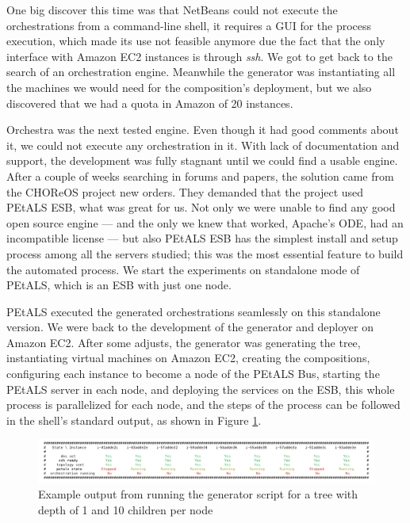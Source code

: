 One big discover this time was that NetBeans could not execute the orchestrations from a command-line shell, it requires a GUI for the process execution, which made its use not feasible anymore due the fact that the only interface with Amazon EC2 instances is through \emph{ssh}. We got to get back to the search of an orchestration engine. Meanwhile the generator was instantiating all the machines we would need for the composition's deployment, but we also discovered that we had a quota in Amazon of 20 instances.

Orchestra was the next tested engine. Even though it had good comments about it, we could not execute any orchestration in it. With lack of documentation and support, the development was fully stagnant until we could find a usable engine. After a couple of weeks searching in forums and papers, the solution came from the CHOReOS project new orders. They demanded that the project used PEtALS ESB, what was great for us. Not only we were unable to find any good open source engine --- and the only we knew that worked, Apache's ODE, had an incompatible license --- but also PEtALS ESB has the simplest install and setup process among all the servers studied; this was the most essential feature to build the automated process. We start the experiments on standalone mode of PEtALS, which is an ESB with just one node.

PEtALS executed the generated orchestrations seamlessly on this standalone version. We were back to the development of the generator and deployer on Amazon EC2. After some adjusts, the generator was generating the tree, instantiating virtual machines on Amazon EC2, creating the compositions, configuring each instance to become a node of the PEtALS Bus, starting the PEtALS server in each node, and deploying the services on the ESB, this whole process is parallelized for each node, and the steps of the process can be followed in the shell's standard output, as shown in Figure \ref{generation-output}.

\begin{figure}[htb]
	\centering
	\includegraphics[trim= 10mm 0mm 10mm 0mm, clip, width=\textwidth]{images/generation-output}
	\caption{Example output from running the generator script for a tree with depth of 1 and 10 children per node}
	\label{generation-output}
\end{figure}

